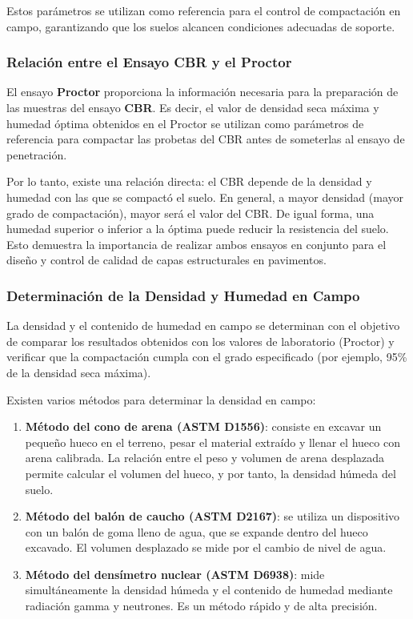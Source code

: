 \documentclass[12pt]{article}
\begin{document}
	Estos parámetros se utilizan como referencia para el control de compactación en campo, garantizando que los suelos alcancen condiciones adecuadas de soporte.
	
	\vspace{0.5cm}
	
	\subsubsection{Relación entre el Ensayo CBR y el Proctor}
	
	El ensayo \textbf{Proctor} proporciona la información necesaria para la preparación de las muestras del ensayo \textbf{CBR}. Es decir, el valor de densidad seca máxima y humedad óptima obtenidos en el Proctor se utilizan como parámetros de referencia para compactar las probetas del CBR antes de someterlas al ensayo de penetración.
	
	Por lo tanto, existe una relación directa: el CBR depende de la densidad y humedad con las que se compactó el suelo. En general, a mayor densidad (mayor grado de compactación), mayor será el valor del CBR. De igual forma, una humedad superior o inferior a la óptima puede reducir la resistencia del suelo. Esto demuestra la importancia de realizar ambos ensayos en conjunto para el diseño y control de calidad de capas estructurales en pavimentos.
	
	\vspace{0.5cm}
	
	\subsubsection{Determinación de la Densidad y Humedad en Campo}
	
	La densidad y el contenido de humedad en campo se determinan con el objetivo de comparar los resultados obtenidos con los valores de laboratorio (Proctor) y verificar que la compactación cumpla con el grado especificado (por ejemplo, 95\% de la densidad seca máxima).
	
	Existen varios métodos para determinar la densidad en campo:
	
	\begin{enumerate}
		\item \textbf{Método del cono de arena (ASTM D1556)}: consiste en excavar un pequeño hueco en el terreno, pesar el material extraído y llenar el hueco con arena calibrada. La relación entre el peso y volumen de arena desplazada permite calcular el volumen del hueco, y por tanto, la densidad húmeda del suelo.
		\item \textbf{Método del balón de caucho (ASTM D2167)}: se utiliza un dispositivo con un balón de goma lleno de agua, que se expande dentro del hueco excavado. El volumen desplazado se mide por el cambio de nivel de agua.
		\item \textbf{Método del densímetro nuclear (ASTM D6938)}: mide simultáneamente la densidad húmeda y el contenido de humedad mediante radiación gamma y neutrones. Es un método rápido y de alta precisión.
	\end{enumerate}
	
\end{document}
